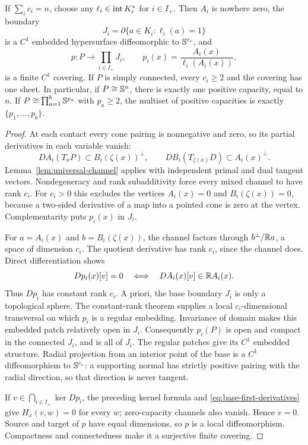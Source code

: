 \begin{theorem}
\label{thm:general-joint-cover}
If $\sum_i c_i=n$, choose any $\ell_i\in\operatorname{int} K_i^*$ for $i\in I_+$.
Then $A_i$ is nowhere zero, the boundary
\[
 J_i=\partial\{a\in K_i:\ell_i(a)=1\}
\]
is a $C^1$ embedded hypersurface diffeomorphic to $\mathbb S^{c_i}$, and
\[
 p:P\longrightarrow\prod_{i\in I_+}J_i,\qquad
 p_i(x)=\frac{A_i(x)}{\ell_i(A_i(x))},
\]
is a finite $C^1$ covering. If $P$ is simply connected, every $c_i\geq2$
and the covering has one sheet. In particular, if $P\cong\mathbb S^n$,
there is exactly one positive capacity, equal to $n$. If
$P\cong\prod_{a=1}^b\mathbb S^{p_a}$ with $p_a\geq2$, the multiset of positive
capacities is exactly $\{p_1,\ldots,p_b\}$.
\end{theorem}
\begin{proof}
At each contact every cone pairing is nonnegative and zero, so its
partial derivatives in each variable vanish:
\begin{equation}\label{eq:base-first-derivatives}
 DA_i(T_xP)\subset B_i(\zeta(x))^\perp,
 \qquad DB_i(T_{\zeta(x)}D)\subset A_i(x)^\perp.
\end{equation}
Lemma~\ref{lem:universal-channel} applies with independent primal and
dual tangent vectors. Nondegeneracy and rank subadditivity force every mixed
channel to have rank $c_i$. For $c_i>0$ this excludes the vertices $A_i(x)=0$ and $B_i(\zeta(x))=0$, because a two-sided derivative of a map into a pointed cone is zero at
the vertex. Complementarity puts $p_i(x)$ in $J_i$.

For $a=A_i(x)$ and $b=B_i(\zeta(x))$, the channel factors through
$b^\perp/\mathbb R a$, a space of dimension $c_i$. The quotient derivative has
rank $c_i$, since the channel does. Direct differentiation shows
\[
 Dp_i(x)[v]=0\quad\Longleftrightarrow\quad
 DA_i(x)[v]\in\mathbb R A_i(x).
\]
Thus $Dp_i$ has constant rank $c_i$. A priori, the base boundary $J_i$ is
only a topological sphere. The constant-rank theorem supplies a local
$c_i$-dimensional transversal on which $p_i$ is a regular embedding.
Invariance of domain makes this embedded patch relatively open in $J_i$.
Consequently $p_i(P)$ is open and compact in the connected $J_i$, and is
all of $J_i$. The regular patches give its $C^1$ embedded structure.
Radial projection from an interior point of the base is a $C^1$
diffeomorphism to $\mathbb S^{c_i}$: a supporting normal has strictly positive
pairing with the radial direction, so that direction is never tangent.

If $v\in\bigcap_{i\in I_+}\ker Dp_i$, the preceding kernel formula and
\eqref{eq:base-first-derivatives} give $H_x(v,w)=0$ for every $w$;
zero-capacity channels also vanish. Hence $v=0$. Source and target of
$p$ have equal dimensions, so $p$ is a local diffeomorphism. Compactness
and connectedness make it a surjective finite covering.


\end{proof}
